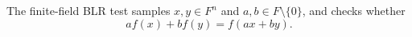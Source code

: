 \begin{definition}
\label{def:finite-field-blr-test}
\leanok
The finite-field BLR test samples $x,y \in F^n$ and
  $a,b \in F \setminus \{0\}$, and checks whether
  \[
    a f(x) + b f(y) = f(ax + by).
  \]
\end{definition}
